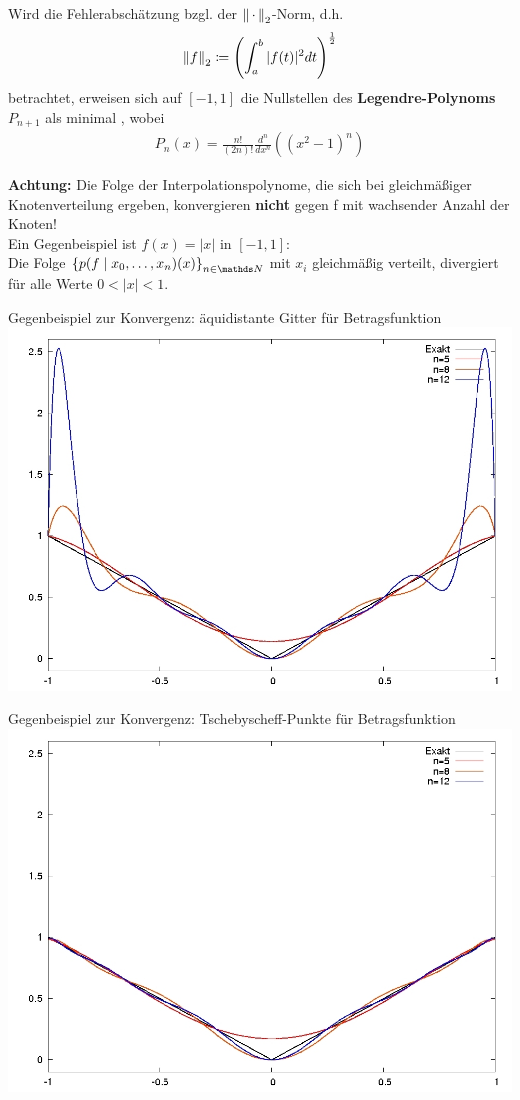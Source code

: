 Wird die Fehlerabschätzung bzgl. der 
$\left\| \,\cdot\, \right\|_2$-Norm,
d.h. 
\begin{gather*}
  \left\| f \right\|_2\coloneqq \left(\int_{a}^{b}|f(t)|^2dt \right)^\frac{1}{2}
\end{gather*}
betrachtet, erweisen sich auf $[-1,1]$ die Nullstellen
des \textbf{Legendre-Polynoms} $P_{n+1}$
als minimal \cite{haemmerlinhoffmann}, wobei
\begin{gather*}
  P_n(x) = \frac{n!}{(2n)!}\frac{d^n}{dx^n}\left((x^2-1)^n\right)
\end{gather*}


\textbf{Achtung:} Die Folge der Interpolationspolynome,
die sich bei gleichmäßiger Knotenverteilung ergeben,
konvergieren \textbf{nicht} gegen f mit wachsender Anzahl der Knoten!\\
Ein Gegenbeispiel ist $f(x)=|x|$ in $[-1,1]$:\\
Die Folge $\left\{p(f\mid x_0,\dots,x_n)(x)\right\}_{n\in\N}$
mit $x_i$ gleichmäßig verteilt,
divergiert für alle Werte $0<|x|<1$.

\begin{image}{Gegenbeispiel zur Konvergenz: äquidistante Gitter für Betragsfunktion}
  \includegraphics[width=0.5\linewidth]{images/afg49aequi.jpg}
\end{image}
\label{6.1.20im1}
\begin{image}{Gegenbeispiel zur Konvergenz: Tschebyscheff-Punkte für Betragsfunktion}
  \includegraphics[width=0.5\linewidth]{images/afg49tscheby.jpeg}
\end{image}
\label{6.1.20im2}

